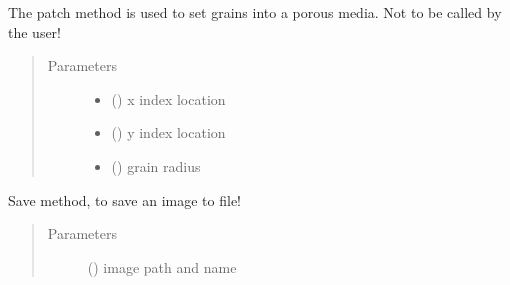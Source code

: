 \documentclass[letterpaper,10pt,english]{sphinxmanual}
\begin{document}
\begin{fulllineitems}
\begin{fulllineitems}
\label{\detokenize{index:lb_colloids.utilities.psphere.PSphere.patch}}
The patch method is used to set grains into a porous media.
Not to be called by the user!
\begin{quote}\begin{description}
\item[{Parameters}] \leavevmode\begin{itemize}
\item {} 
 () \textendash{} x index location

\item {} 
 () \textendash{} y index location

\item {} 
 () \textendash{} grain radius

\end{itemize}

\end{description}\end{quote}

\end{fulllineitems}


\begin{fulllineitems}
\label{\detokenize{index:lb_colloids.utilities.psphere.PSphere.save_image}}
Save method, to save an image to file!
\begin{quote}\begin{description}
\item[{Parameters}] \leavevmode
{} () \textendash{} image path and name

\end{description}\end{quote}

\end{fulllineitems}



\end{fulllineitems}
\end{document}
